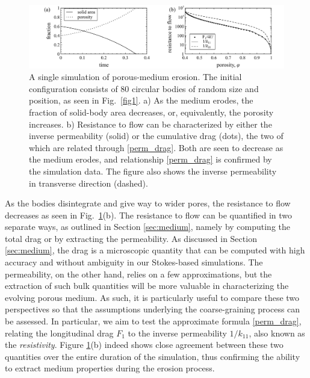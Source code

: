 \documentclass[3p]{elsarticle}
\begin{document}
\begin{figure}%
\centering
\includegraphics[width = 0.99 \textwidth]{./figs/fig2.pdf}
\caption{A single simulation of porous-medium erosion. The initial configuration consists of 80 circular bodies of random size and position, as seen in Fig.~\ref{fig1}. a) As the medium erodes, the fraction of solid-body area decreases, or, equivalently, the porosity increases. b) Resistance to flow can be characterized by either the inverse permeability (solid) or the cumulative drag (dots), the two of which are related through \eqref{perm_drag}. Both are seen to decrease as the medium erodes, and relationship \eqref{perm_drag} is confirmed by the simulation data. The figure also shows the inverse permeability in transverse direction (dashed).
 \label{fig2}
}
\end{figure}

As the bodies disintegrate and give way to wider pores, the resistance to flow decreases as seen in Fig.~\ref{fig2}(b). The resistance to flow can be quantified in two separate ways, as outlined in Section \ref{sec:medium}, namely by computing the total drag or by extracting the permeability. As discussed in Section \ref{sec:medium}, the drag is a microscopic quantity that can be computed with high accuracy and without ambiguity in our Stokes-based simulations. The permeability, on the other hand, relies on a few approximations, but the extraction of such bulk quantities will be more valuable in characterizing the evolving porous medium. As such, it is particularly useful to compare these two perspectives so that the assumptions underlying the coarse-graining process can be assessed. In particular, we aim to test the approximate formula \eqref{perm_drag}, relating the longitudinal drag $F_1$ to the inverse permeability $1/k_{11}$, also known as the {\em resistivity}. Figure \ref{fig2}(b) indeed shows close agreement between these two quantities over the entire duration of the simulation, thus confirming the ability to extract medium properties during the erosion process.
\end{document}
